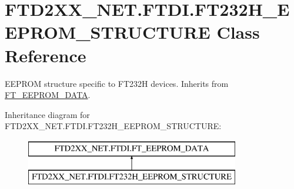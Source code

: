 \hypertarget{class_f_t_d2_x_x___n_e_t_1_1_f_t_d_i_1_1_f_t232_h___e_e_p_r_o_m___s_t_r_u_c_t_u_r_e}{}\section{F\+T\+D2\+X\+X\+\_\+\+N\+E\+T.\+F\+T\+D\+I.\+F\+T232\+H\+\_\+\+E\+E\+P\+R\+O\+M\+\_\+\+S\+T\+R\+U\+C\+T\+U\+RE Class Reference}
\label{class_f_t_d2_x_x___n_e_t_1_1_f_t_d_i_1_1_f_t232_h___e_e_p_r_o_m___s_t_r_u_c_t_u_r_e}


E\+E\+P\+R\+OM structure specific to F\+T232H devices. Inherits from \mbox{\hyperlink{class_f_t_d2_x_x___n_e_t_1_1_f_t_d_i_1_1_f_t___e_e_p_r_o_m___d_a_t_a}{F\+T\+\_\+\+E\+E\+P\+R\+O\+M\+\_\+\+D\+A\+TA}}.  


Inheritance diagram for F\+T\+D2\+X\+X\+\_\+\+N\+E\+T.\+F\+T\+D\+I.\+F\+T232\+H\+\_\+\+E\+E\+P\+R\+O\+M\+\_\+\+S\+T\+R\+U\+C\+T\+U\+RE\+:\begin{figure}[H]
\begin{center}
\leavevmode
\includegraphics[height=2.000000cm]{class_f_t_d2_x_x___n_e_t_1_1_f_t_d_i_1_1_f_t232_h___e_e_p_r_o_m___s_t_r_u_c_t_u_r_e}
\end{center}
\end{figure}
